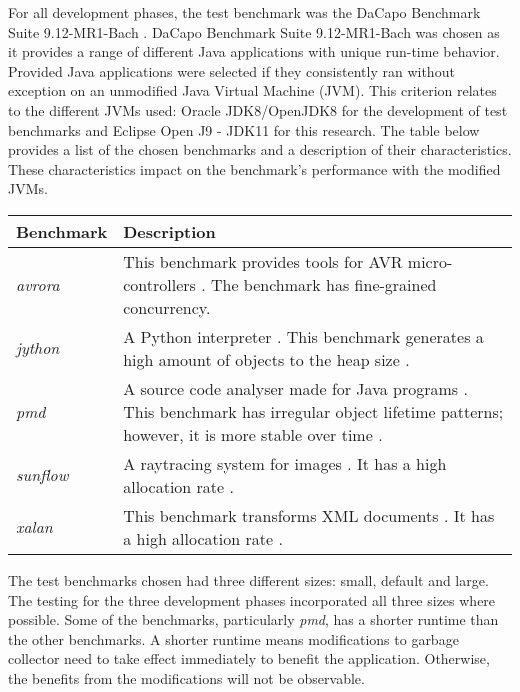 For all development phases, the test benchmark was the DaCapo Benchmark Suite 9.12-MR1-Bach \cite{blackburn2006dacapo}. DaCapo Benchmark Suite 9.12-MR1-Bach was chosen as it provides a range of different Java applications with unique run-time behavior. Provided Java applications were selected if they consistently ran without exception on an unmodified Java Virtual Machine (JVM). This
criterion relates to the different JVMs used: Oracle JDK8/OpenJDK8 for the development of test benchmarks and Eclipse Open J9 - JDK11 for this research.
\newline\newline
The table below provides a list of the chosen benchmarks and a description of their characteristics. These characteristics impact on the benchmark's performance with the modified JVMs.

\begin{center}
\begin{tabular}{|m{3cm}|m{8cm}|}
\hline
\textbf{Benchmark} & \textbf{Description}\tabularnewline
\hline

\emph{avrora} & This benchmark provides tools for AVR micro-controllers
\cite{dacapobenchmark2018}. The benchmark has fine-grained
concurrency.\tabularnewline
\hline
\emph{jython} & A Python interpreter \cite{blackburn2006dacapo}. This
benchmark generates a high amount of objects to the heap size \cite{blackburn2006dacapo}.\tabularnewline
\hline

\emph{pmd} & A source code analyser made for Java programs \cite{blackburn2006dacapo}. This benchmark has irregular object lifetime patterns;
however, it is more stable over time \cite{blackburn2006dacapo}.\tabularnewline
\hline

\emph{sunflow} & A raytracing system for images \cite{dacapobenchmark2018}. It has a high allocation rate \cite{lengauer2017comprehensive}.\tabularnewline
\hline

\emph{xalan} & This benchmark transforms XML documents \cite{blackburn2006dacapo}. It has a high allocation rate \cite{blackburn2006dacapo}.\tabularnewline
\hline

\end{tabular}
\end{center}
The test benchmarks chosen had three different sizes: small, default and
large. The testing for the three development phases incorporated all
three sizes where possible.
\newline\newline
Some of the benchmarks, particularly \emph{pmd}, has a shorter runtime than the other benchmarks. A shorter runtime means modifications to garbage collector need to take effect immediately to benefit the application. Otherwise, the benefits from the modifications will not be observable. 



